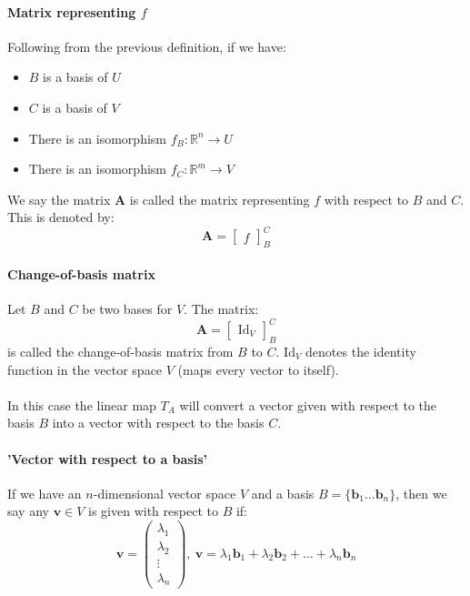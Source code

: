 \documentclass{article}
\newcommand{\R}{\mathbb{R}}
\renewcommand{\vec}[1]{\mathbf{#1}}
\begin{document}
\paragraph{Matrix representing $ f $}
Following from the previous definition, if we have:
\begin{itemize}
\item $ B $ is a basis of $ U $
\item $ C $ is a basis of $ V $
\item There is an isomorphism $ f_{B} : \R^{n} \to U $
\item There is an isomorphism $ f_{C} : \R^{m} \to V $
\end{itemize}
We say the matrix $ \vec{A} $ is called the matrix representing $ f $ with respect to $ B $ and $ C $. This is denoted by:
\begin{equation}
\vec{A} =
\begin{bmatrix}
f
\end{bmatrix}_{B}^{C}
\end{equation}
\paragraph{Change-of-basis matrix}
Let $ B $ and $ C $ be two bases for $ V $. The matrix:
\begin{equation}
\vec{A} =
\begin{bmatrix}
\textrm{Id}_{V}
\end{bmatrix}_{B}^{C}
\end{equation}
is called the change-of-basis matrix from $ B $ to $ C $. $ \textrm{Id}_{V} $ denotes the identity function in the vector space $ V $ (maps every vector to itself).
\\\\
In this case the linear map $ T_{A} $ will convert a vector given with respect to the basis $ B $ into a vector with respect to the basis $ C $.
\paragraph{'Vector with respect to a basis'}
If we have an $ n $-dimensional vector space $ V $ and a basis $ B = \{\vec{b}_{1} ... \vec{b}_{n} \} $, then we say any $ \vec{v} \in V $  is given with respect to $ B $ if:
\begin{equation}
\vec{v} = 
\begin{pmatrix}
\lambda_{1} \\ \lambda_{2} \\ \vdots \\ \lambda_{n}
\end{pmatrix} , \ 
\vec{v} = \lambda_{1}\vec{b}_{1} + \lambda_{2}\vec{b}_{2} + ... + \lambda_{n}\vec{b}_{n}
\end{equation}
\end{document}
